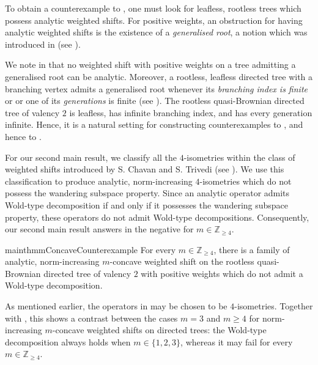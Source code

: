 \documentclass[11pt, reqno, a4paper]{amsart}
\theoremstyle{definition}
\renewcommand{\ge}{\geqslant}
\newcommand{\Z}{\mathbb Z}
\numberwithin{equation}{section}
\begin{document}
    To obtain a counterexample to , one must look for leafless, rootless trees which possess analytic weighted shifts. For positive weights, an obstruction for having analytic weighted shifts is the existence of a \textit{generalised root}, a notion which was introduced in \cite{MR3532172} (see ).
    
    We note in  that no weighted shift with positive weights on a tree admitting a generalised root can be analytic. Moreover, a rootless, leafless directed tree with a branching vertex admits a generalised root whenever its \textit{branching index is finite} or or one of its \textit{generations} is finite (see ). The rootless quasi-Brownian directed tree of valency $2$ is leafless, has infinite branching index, and has every generation infinite. Hence, it is a natural setting for constructing counterexamples to , and hence to .
    
    For our second main result, we classify all the $4$-isometries within the class of weighted shifts introduced by S. Chavan and S. Trivedi (see ). We use this classification to produce analytic, norm-increasing $4$-isometries which do not possess the wandering subspace property. Since an analytic operator admits Wold-type decomposition if and only if it possesses the wandering subspace property, these operators do not admit Wold-type decompositions. Consequently, our second main result answers  in the negative for $m \in \Z_{\ge 4}$.

    \begin{restatable}{mainthm}{mConcaveCounterexample}
    \label{thm:counterexample}
        For every $m\in \Z_{\ge 4}$, there is a family of analytic, norm-increasing $m$-concave weighted shift on the rootless quasi-Brownian directed tree of valency $2$ with positive weights which do not admit a Wold-type decomposition.
    \end{restatable}

    As mentioned earlier, the operators in  may be chosen to be $4$-isometries. Together with , this shows a contrast between the cases $m=3$ and $m\ge4$ for
    norm-increasing $m$-concave weighted shifts on directed trees: the Wold-type decomposition always holds when $m\in \{ 1,2,3 \}$, whereas it may fail for every $m\in \Z_{\ge 4}$.
\end{document}
